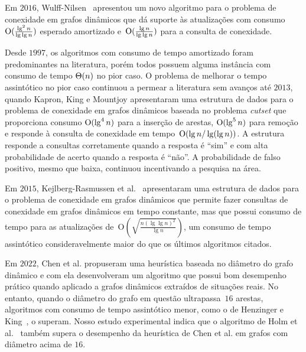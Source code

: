 Em $2016$, Wulff-Nilsen~\cite{Wulff-Nilsen2016} apresentou um novo algoritmo para o problema de conexidade em grafos dinâmicos que dá suporte às atualizações com consumo~$\mathrm{O}(\frac{\lg^2 n}{\lg \lg n})$ esperado amortizado e~$\mathrm{O}(\frac{\lg n}{\lg \lg n})$ para a consulta de conexidade.

Desde $1997$, os algoritmos com consumo de tempo amortizado foram predominantes na literatura, porém todos possuem alguma instância com consumo de tempo $\Theta(n)$ no pior caso.
O problema de melhorar o tempo assintótico no pior caso continuou a permear a literatura sem avanços até $2013$, quando Kapron, King e Mountjoy \cite{bruceM} apresentaram uma estrutura de dados para o problema de conexidade em grafos dinâmicos baseada no problema \textit{cutset} que proporciona consumo $\mathrm{O}(\lg^4 n)$ para a inserção de arestas, $\mathrm{O}(\lg^5 n)$ para remoção e responde à consulta de conexidade em tempo~$\mathrm{O}(\lg n / \lg(\lg n))$.
A estrutura responde a consultas corretamente quando a resposta é “sim” e com alta probabilidade de acerto quando a resposta é “não”. A probabilidade de falso positivo, mesmo que baixa, continuou incentivando a pesquisa na área. 

Em $2015$, Kejlberg-Rasmussen et al.~\cite{kejlbergrasmussen_et_al} apresentaram uma estrutura de dados para o problema de conexidade em grafos dinâmicos que permite fazer consultas de conexidade em grafos dinâmicos em tempo constante, mas que possui consumo de tempo para as atualizações de~$\mathrm{O}\!\left(\sqrt{\frac{n\left(\lg \lg n\right)^2}{\lg n}}\right)$, um consumo de tempo assintótico consideravelmente maior do que os últimos algoritmos citados.

Em $2022$, Chen et al. \cite{QC22} propuseram uma heurística baseada no diâmetro do grafo dinâmico e com ela desenvolveram um algoritmo que possui bom desempenho prático quando aplicado a grafos dinâmicos extraídos de situações reais.
No entanto, quando o diâmetro do grafo em questão ultrapassa~$16$ arestas, algoritmos com consumo de tempo assintótico menor, como o de Henzinger e King~\cite{HenzingerKing}, o superam.
Nosso estudo experimental indica que o algoritmo de Holm et al.~\cite{poly_log} também supera o desempenho da heurística de Chen et al. em grafos com diâmetro acima de $16$.

